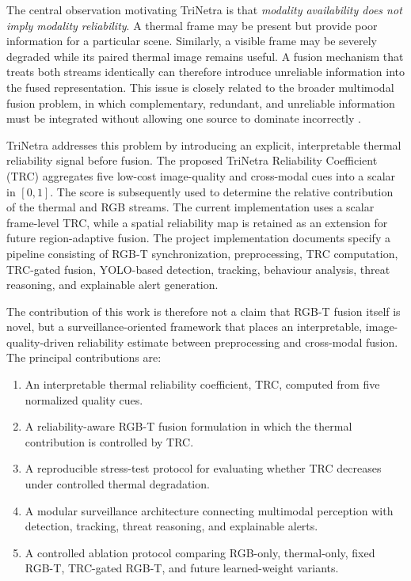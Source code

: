 \documentclass[conference]{IEEEtran}
\begin{document}
The central observation motivating TriNetra is that \emph{modality availability does not imply modality reliability}. A thermal frame may be present but provide poor information for a particular scene. Similarly, a visible frame may be severely degraded while its paired thermal image remains useful. A fusion mechanism that treats both streams identically can therefore introduce unreliable information into the fused representation. This issue is closely related to the broader multimodal fusion problem, in which complementary, redundant, and unreliable information must be integrated without allowing one source to dominate incorrectly \cite{deepFusion}.

TriNetra addresses this problem by introducing an explicit, interpretable thermal reliability signal before fusion. The proposed TriNetra Reliability Coefficient (TRC) aggregates five low-cost image-quality and cross-modal cues into a scalar in $[0,1]$. The score is subsequently used to determine the relative contribution of the thermal and RGB streams. The current implementation uses a scalar frame-level TRC, while a spatial reliability map is retained as an extension for future region-adaptive fusion. The project implementation documents specify a pipeline consisting of RGB-T synchronization, preprocessing, TRC computation, TRC-gated fusion, YOLO-based detection, tracking, behaviour analysis, threat reasoning, and explainable alert generation.

The contribution of this work is therefore not a claim that RGB-T fusion itself is novel, but a surveillance-oriented framework that places an interpretable, image-quality-driven reliability estimate between preprocessing and cross-modal fusion. The principal contributions are:

\begin{enumerate}
    \item An interpretable thermal reliability coefficient, TRC, computed from five normalized quality cues.
    \item A reliability-aware RGB-T fusion formulation in which the thermal contribution is controlled by TRC.
    \item A reproducible stress-test protocol for evaluating whether TRC decreases under controlled thermal degradation.
    \item A modular surveillance architecture connecting multimodal perception with detection, tracking, threat reasoning, and explainable alerts.
    \item A controlled ablation protocol comparing RGB-only, thermal-only, fixed RGB-T, TRC-gated RGB-T, and future learned-weight variants.
\end{enumerate}
\end{document}
